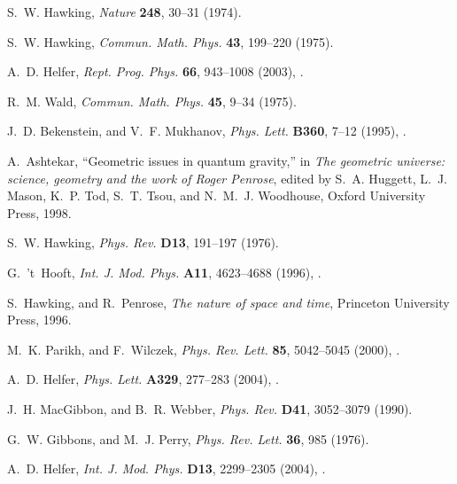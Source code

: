 \documentclass[12pt]{article}
\begin{document}
\begin{thebibliography}{57}
S.~W. Hawking, \emph{Nature} \textbf{248}, 30--31 (1974).

S.~W. Hawking, \emph{Commun. Math. Phys.} \textbf{43}, 199--220 (1975).

A.~D. Helfer, \emph{Rept. Prog. Phys.} \textbf{66}, 943--1008 (2003),
  .

R.~M. Wald, \emph{Commun. Math. Phys.} \textbf{45}, 9--34 (1975).

J.~D. Bekenstein, and V.~F. Mukhanov, \emph{Phys. Lett.} \textbf{B360}, 7--12
  (1995), .

A.~Ashtekar, \enquote{Geometric issues in quantum gravity,} in \emph{The
  geometric universe: science, geometry and the work of Roger Penrose}, edited
  by S.~A. Huggett, L.~J. Mason, K.~P. Tod, S.~T. Tsou, and N.~M.~J. Woodhouse,
  Oxford University Press, 1998.

S.~W. Hawking, \emph{Phys. Rev.} \textbf{D13}, 191--197 (1976).

G.~'t~Hooft, \emph{Int. J. Mod. Phys.} \textbf{A11}, 4623--4688 (1996),
  .

S.~Hawking, and R.~Penrose, \emph{The nature of space and time}, Princeton
  University Press, 1996.

M.~K. Parikh, and F.~Wilczek, \emph{Phys. Rev. Lett.} \textbf{85}, 5042--5045
  (2000), .

A.~D. Helfer, \emph{Phys. Lett.} \textbf{A329}, 277--283 (2004{}),
  .

J.~H. MacGibbon, and B.~R. Webber, \emph{Phys. Rev.} \textbf{D41}, 3052--3079
  (1990).

G.~W. Gibbons, and M.~J. Perry, \emph{Phys. Rev. Lett.} \textbf{36}, 985
  (1976).

A.~D. Helfer, \emph{Int. J. Mod. Phys.} \textbf{D13}, 2299--2305
  (2004{}), .


\end{thebibliography}
\end{document}
